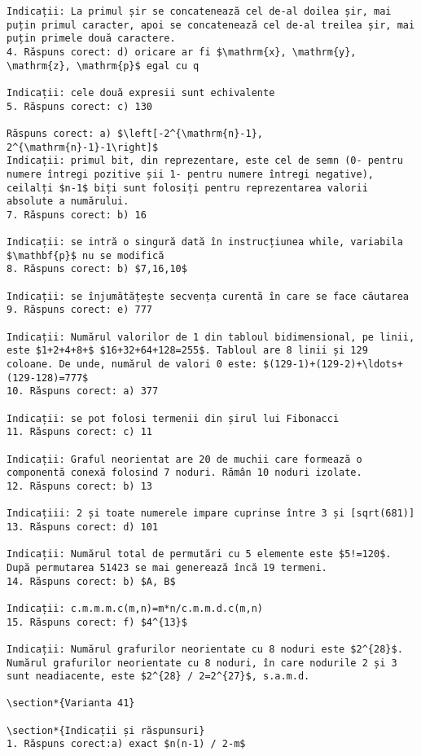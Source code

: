 \begin{verbatim}
Indicații: La primul șir se concatenează cel de-al doilea șir, mai puțin primul caracter, apoi se concatenează cel de-al treilea șir, mai puțin primele două caractere.
4. Răspuns corect: d) oricare ar fi $\mathrm{x}, \mathrm{y}, \mathrm{z}, \mathrm{p}$ egal cu q

Indicații: cele două expresii sunt echivalente
5. Răspuns corect: c) 130

Răspuns corect: a) $\left[-2^{\mathrm{n}-1}, 2^{\mathrm{n}-1}-1\right]$
Indicații: primul bit, din reprezentare, este cel de semn (0- pentru numere întregi pozitive șii 1- pentru numere întregi negative), ceilalți $n-1$ biți sunt folosiți pentru reprezentarea valorii absolute a numărului.
7. Răspuns corect: b) 16

Indicații: se intră o singură dată în instrucțiunea while, variabila $\mathbf{p}$ nu se modifică
8. Răspuns corect: b) $7,16,10$

Indicații: se înjumătățește secvența curentă în care se face căutarea
9. Răspuns corect: e) 777

Indicații: Numărul valorilor de 1 din tabloul bidimensional, pe linii, este $1+2+4+8+$ $16+32+64+128=255$. Tabloul are 8 linii și 129 coloane. De unde, numărul de valori 0 este: $(129-1)+(129-2)+\ldots+(129-128)=777$
10. Răspuns corect: a) 377

Indicații: se pot folosi termenii din șirul lui Fibonacci
11. Răspuns corect: c) 11

Indicații: Graful neorientat are 20 de muchii care formează o componentă conexă folosind 7 noduri. Rămân 10 noduri izolate.
12. Răspuns corect: b) 13

Indicațiii: 2 și toate numerele impare cuprinse între 3 și [sqrt(681)]
13. Răspuns corect: d) 101

Indicații: Numărul total de permutări cu 5 elemente este $5!=120$. După permutarea 51423 se mai generează încă 19 termeni.
14. Răspuns corect: b) $A, B$

Indicații: c.m.m.m.c(m,n)=m*n/c.m.m.d.c(m,n)
15. Răspuns corect: f) $4^{13}$

Indicații: Numărul grafurilor neorientate cu 8 noduri este $2^{28}$. Numărul grafurilor neorientate cu 8 noduri, în care nodurile 2 și 3 sunt neadiacente, este $2^{28} / 2=2^{27}$, s.a.m.d.

\section*{Varianta 41}

\section*{Indicații și răspunsuri}
1. Răspuns corect:a) exact $n(n-1) / 2-m$


\end{verbatim}
